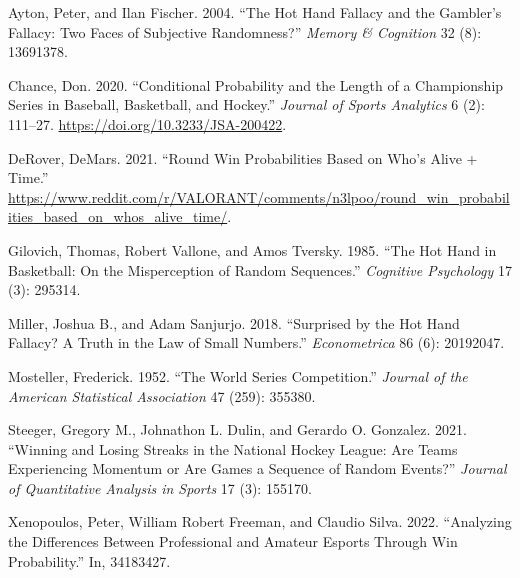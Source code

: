\documentclass[
]{article}
\newlength{\cslhangindent}
\newlength{\cslentryspacingunit} %
\newenvironment{CSLReferences}[2] %
 {%
  \setlength{\parindent}{0pt}
  \ifodd #1
  \let\oldpar\par
  \def\par{\hangindent=\cslhangindent\oldpar}
  \fi
  \setlength{\parskip}{#2\cslentryspacingunit}
 }%
 {}
\begin{document}
\hypertarget{refs}{}
\begin{CSLReferences}{1}{0}
\leavevmode{}%
Ayton, Peter, and Ilan Fischer. 2004. {``The Hot Hand Fallacy and the
Gambler{'}s Fallacy: Two Faces of Subjective Randomness?''} \emph{Memory
\& Cognition} 32 (8): 13691378.

\leavevmode{}%
Chance, Don. 2020. {``Conditional Probability and the Length of a
Championship Series in Baseball, Basketball, and Hockey.''}
\emph{Journal of Sports Analytics} 6 (2): 111--27.
\url{https://doi.org/10.3233/JSA-200422}.

\leavevmode{}%
DeRover, DeMars. 2021. {``Round Win Probabilities Based on Who's Alive +
Time.''}
\url{https://www.reddit.com/r/VALORANT/comments/n3lpoo/round_win_probabilities_based_on_whos_alive_time/}.

\leavevmode{}%
Gilovich, Thomas, Robert Vallone, and Amos Tversky. 1985. {``The Hot
Hand in Basketball: On the Misperception of Random Sequences.''}
\emph{Cognitive Psychology} 17 (3): 295314.

\leavevmode{}%
Miller, Joshua B., and Adam Sanjurjo. 2018. {``Surprised by the Hot Hand
Fallacy? A Truth in the Law of Small Numbers.''} \emph{Econometrica} 86
(6): 20192047.

\leavevmode{}%
Mosteller, Frederick. 1952. {``The World Series Competition.''}
\emph{Journal of the American Statistical Association} 47 (259): 355380.

\leavevmode{}%
Steeger, Gregory M., Johnathon L. Dulin, and Gerardo O. Gonzalez. 2021.
{``Winning and Losing Streaks in the National Hockey League: Are Teams
Experiencing Momentum or Are Games a Sequence of Random Events?''}
\emph{Journal of Quantitative Analysis in Sports} 17 (3): 155170.

\leavevmode{}%
Xenopoulos, Peter, William Robert Freeman, and Claudio Silva. 2022.
{``Analyzing the Differences Between Professional and Amateur Esports
Through Win Probability.''} In, 34183427.

\end{CSLReferences}
\end{document}
